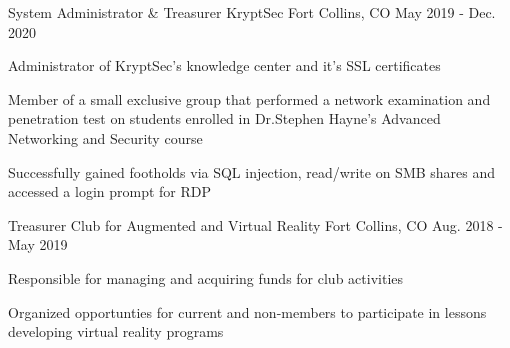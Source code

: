 

\begin{cventries}


\cventry
{System Administrator \& Treasurer} %
{KryptSec} %
{Fort Collins, CO} %
{May 2019 - Dec. 2020} %
{
  \begin{cvitems} %
    \item {Administrator of KryptSec’s knowledge center and it’s SSL certificates}
    \item {Member of a small exclusive group that performed a network examination and penetration test on students enrolled in Dr.Stephen Hayne’s Advanced Networking and Security course}
    \item {Successfully gained footholds via SQL injection, read/write on SMB shares and accessed a login prompt for RDP}
  \end{cvitems}
}


  \cventry
    {Treasurer} %
    {Club for Augmented and Virtual Reality} %
    {Fort Collins, CO} %
    {Aug. 2018 - May 2019} %
    {
      \begin{cvitems} %
        \item {Responsible for managing and acquiring funds for club activities}
        \item {Organized opportunties for current and non-members to participate in lessons developing virtual reality programs}
      \end{cvitems}
    }

\end{cventries}
